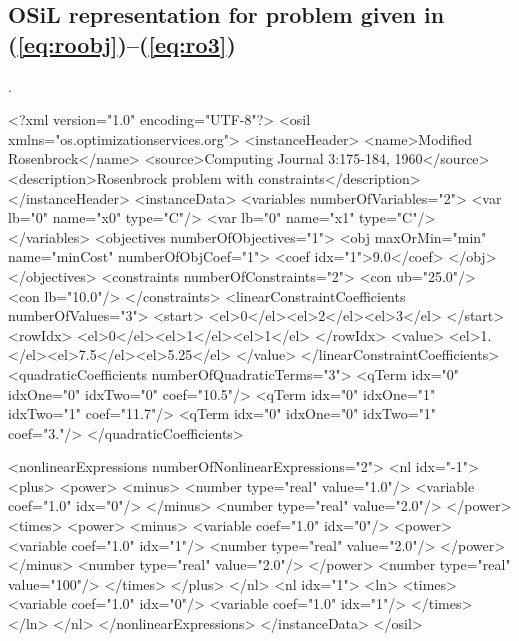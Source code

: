 \documentclass[11pt]{article}
\renewcommand{\_}{{\char"5F}}
\renewcommand{\{}{{\char"7B}}
\renewcommand{\}}{{\char"7D}}
\renewcommand{\^}{{\char"0D}}
\renewcommand{\'}{{\char"0D}}
\begin{document}
\subsection{OSiL representation for problem given in (\ref{eq:roobj})--(\ref{eq:ro3})}. 


{\normalsize \baselineskip 16pt \vspace{2pt}
\begin{verbatimtab}[5]
<?xml version="1.0" encoding="UTF-8"?>
<osil xmlns="os.optimizationservices.org">
	<instanceHeader>
		<name>Modified Rosenbrock</name>
		<source>Computing Journal 3:175-184, 1960</source>
		<description>Rosenbrock problem with constraints</description>
	</instanceHeader>
	<instanceData>
		<variables numberOfVariables="2">
			<var lb="0" name="x0" type="C"/>
			<var lb="0" name="x1" type="C"/>
		</variables>
		<objectives numberOfObjectives="1">
			<obj maxOrMin="min" name="minCost" numberOfObjCoef="1">
				<coef idx="1">9.0</coef>
			</obj>
		</objectives>
		<constraints numberOfConstraints="2">
			<con ub="25.0"/>
			<con lb="10.0"/>
		</constraints>
		<linearConstraintCoefficients numberOfValues="3">
			<start>
				<el>0</el><el>2</el><el>3</el>
			</start>
			<rowIdx>
				<el>0</el><el>1</el><el>1</el>
			</rowIdx>
			<value>
				<el>1.</el><el>7.5</el><el>5.25</el>
			</value>
		</linearConstraintCoefficients>
		<quadraticCoefficients numberOfQuadraticTerms="3">
			<qTerm idx="0" idxOne="0" idxTwo="0" coef="10.5"/>
			<qTerm idx="0" idxOne="1" idxTwo="1" coef="11.7"/>
			<qTerm idx="0" idxOne="0" idxTwo="1" coef="3."/>
		</quadraticCoefficients>
\end{verbatimtab}
   \newpage
\begin{verbatimtab}[5]
		<nonlinearExpressions numberOfNonlinearExpressions="2">
			<nl idx="-1">
				<plus>
					<power>
						<minus>
							<number type="real" value="1.0"/>
							<variable coef="1.0" idx="0"/>
						</minus>
						<number type="real" value="2.0"/>
					</power>
					<times>
						<power>
							<minus>
								<variable coef="1.0" idx="0"/>
								<power>
									<variable coef="1.0" idx="1"/>
									<number type="real" value="2.0"/>
								</power>
							</minus>
							<number type="real" value="2.0"/>
						</power>
						<number type="real" value="100"/>
					</times>
				</plus>
			</nl>
			<nl idx="1">
				<ln>
					<times>
						<variable coef="1.0" idx="0"/>
						<variable coef="1.0" idx="1"/>
					</times>
				</ln>
			</nl>
		</nonlinearExpressions>
	</instanceData>
</osil>
\end{verbatimtab}

}%
\end{document}
